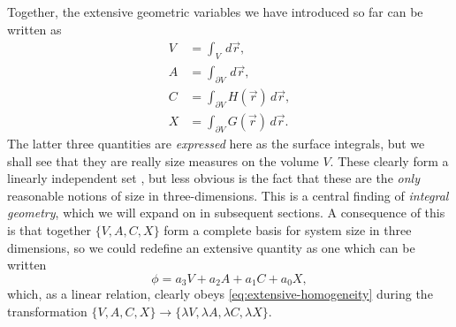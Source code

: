 Together, the extensive geometric variables we have introduced so far can be written as%
\begin{subequations}\label{eq:intrinsic-volumes-surface-integrals}
  \begin{align}
    \label{eq:volume-measure}
    V
    &=
    \int_V \, d\vec{r},
    \\
    A
    &=
    \int_{\partial V} \, d\vec{r},
    \\
    C
    &=
    \int_{\partial V} H(\vec{r}) \, d\vec{r},
    \\
    X
    &=
    \int_{\partial V} G(\vec{r}) \, d\vec{r}.
  \end{align}
\end{subequations}
The latter three quantities are \emph{expressed} here as the surface integrals, but we shall see that they are really size measures on the volume $V$.
These clearly form a linearly independent set%
,
but less obvious is the fact that these are the \emph{only} reasonable notions of size in three-dimensions.
This is a central finding of \emph{integral geometry}, which we will expand on in subsequent sections.
A consequence of this is that together $\{V, A, C, X\}$ form a complete basis for system size in three dimensions, so we could redefine an extensive quantity as one which can be written
\begin{equation}\label{eq:extensive-integral-geometry}
  \phi = a_3 V + a_2 A + a_1 C + a_0 X,
\end{equation}
which, as a linear relation, clearly obeys \eqref{eq:extensive-homogeneity} during the transformation%
$\{V, A, C, X\} \to \{\lambda V, \lambda A, \lambda C, \lambda X\}$.

